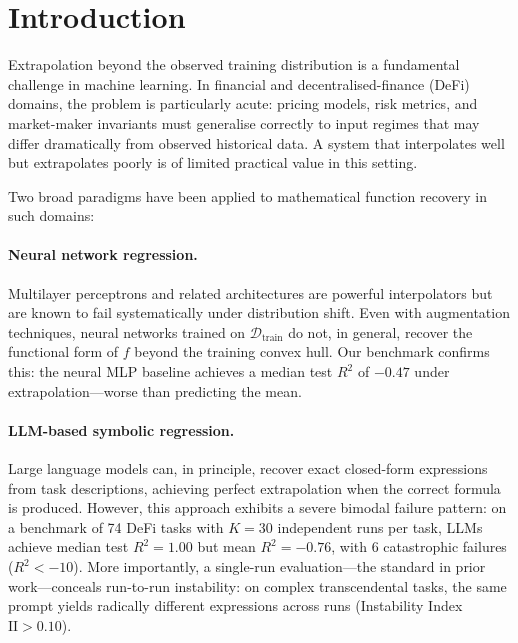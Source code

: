 \documentclass[twoside,11pt]{article}
\newcommand{\Rsq}{R^{2}}
\newcommand{\II}{\mathrm{II}}
\begin{document}
\tableofcontents
\newpage

\section{Introduction}
\label{sec:intro}

Extrapolation beyond the observed training distribution is a fundamental challenge
in machine learning.  In financial and decentralised-finance (DeFi) domains, the
problem is particularly acute: pricing models, risk metrics, and market-maker
invariants must generalise correctly to input regimes that may differ dramatically
from observed historical data.  A system that interpolates well but extrapolates
poorly is of limited practical value in this setting.

Two broad paradigms have been applied to mathematical function recovery in such
domains:

\paragraph{Neural network regression.}
Multilayer perceptrons and related architectures are powerful interpolators but
are known to fail systematically under distribution shift.  Even with augmentation
techniques, neural networks trained on $\mathcal{D}_{\mathrm{train}}$ do not, in
general, recover the functional form of $f$ beyond the training convex hull.  Our
benchmark confirms this: the neural MLP baseline achieves a median test $\Rsq$ of
$-0.47$ under extrapolation---worse than predicting the mean.

\paragraph{LLM-based symbolic regression.}
Large language models can, in principle, recover exact closed-form expressions from
task descriptions, achieving perfect extrapolation when the correct formula is
produced.  However, this approach exhibits a severe bimodal failure pattern: on
a benchmark of 74 DeFi tasks with $K=30$ independent runs per task, LLMs achieve
median test $\Rsq=1.00$ but mean $\Rsq=-0.76$, with 6 catastrophic failures
($\Rsq < -10$).  More importantly, a single-run evaluation---the standard in prior
work---conceals run-to-run instability: on complex transcendental tasks, the same
prompt yields radically different expressions across runs (Instability Index
$\II > 0.10$).
\end{document}
